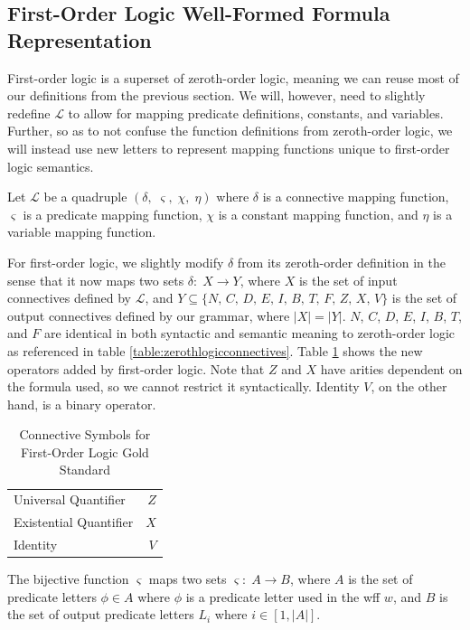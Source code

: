\documentclass[ms]{uncgdissertationexp2}
\theoremstyle{plain}
\theoremstyle{definition}
\theoremstyle{remark}
\begin{document}
\subsection{First-Order Logic Well-Formed Formula Representation}
First-order logic is a superset of zeroth-order logic, meaning we can reuse most of our definitions from the previous section. We will, however, need to slightly redefine $\mathcal{L}$ to allow for mapping predicate definitions, constants, and variables. Further, so as to not confuse the function definitions from zeroth-order logic, we will instead use new letters to represent mapping functions unique to first-order logic semantics.

Let $\mathcal{L}$ be a quadruple $(\delta,\;\varsigma,\;\chi,\;\eta)$ where $\delta$ is a connective mapping function, $\varsigma$ is a predicate mapping function, $\chi$ is a constant mapping function, and $\eta$ is a variable mapping function. 

For first-order logic, we slightly modify $\delta$ from its zeroth-order definition in the sense that it now maps two sets $\delta:\;X \to Y$, where $X$ is the set of input connectives defined by $\mathcal{L}$, and $Y \subseteq \{N,\,C,\,D,\,E,\,I,\,B,\,T,\,F,\,Z,\,X,\,V\}$ is the set of output connectives defined by our grammar, where $|X| = |Y|$. $N$, $C$, $D$, $E$, $I$, $B$, $T$, and $F$ are identical in both syntactic and semantic meaning to zeroth-order logic as referenced in table \ref{table:zerothlogicconnectives}. Table \ref{table:firstlogicconnectives} shows the new operators added by first-order logic. Note that $Z$ and $X$ have arities dependent on the formula used, so we cannot restrict it syntactically. Identity $V$, on the other hand, is a binary operator.
\begin{table}[!ht]
	\caption{Connective Symbols for First-Order Logic Gold Standard}
	\label{table:firstlogicconnectives}
	\centering
	\begin{tabular}{lr}
	  \toprule
	  \thead{Semantic Meaning}&\thead{Connective Symbol}\\
	  \midrule
	  Universal Quantifier&$Z$\\
	  Existential Quantifier&$X$\\
	  Identity&$V$\\
	\bottomrule
  \end{tabular}
\end{table}

The bijective function $\varsigma$ maps two sets $\varsigma:\;A \to B$, where $A$ is the set of predicate letters $\phi \in A$ where $\phi$ is a predicate letter used in the wff $w$, and $B$ is the set of output predicate letters $L_{i}$ where $i \in [1, |A|]$.
\end{document}
